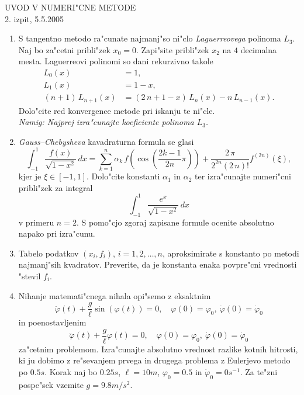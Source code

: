 

\begin{center}
  {\large UVOD V NUMERI"CNE METODE\\
    2. izpit, 5.5.2005\\
    }
\end{center}
\vspace{1cm}

\begin{enumerate}

  \item S tangentno metodo ra"cunate najmanj"so ni"clo
      {\sl Laguerreovega} polinoma $L_3$. Naj bo za"cetni pribli"zek
      $x_0=0$. Zapi"site pribli"zek $x_2$ na $4$ decimalna mesta.
      Laguerreovi polinomi so dani rekurzivno takole
      \begin{align*}
        L_0(x)&=1,\\
        L_1(x)&=1-x,\\
        (n+1)\,L_{n+1}(x)&=(2\,n+1-x)\,L_n(x)-n\,L_{n-1}(x).
      \end{align*}
      Dolo"cite red konvergence metode pri iskanju te ni"cle.\\
      {\sl Namig: Najprej izra"cunajte koeficiente polinoma $L_3$.}
  
  \item {\sl Gauss--Chebysheva} kavadraturna formula
      se glasi
      $$\int_{-1}^{1}\frac{f(x)}{\sqrt{1-x^2}}\,dx=
        \sum_{k=1}^n \alpha_k\,f\left(\cos\left(\frac{2k-1}{2n}\pi\right)\right)+
        \frac{2\,\pi}{2^{2n}(2\,n)!}f^{(2n)}(\xi),$$ 
      kjer je $\xi\in[-1,1]$. 
      Dolo"cite konstanti $\alpha_1$ in $\alpha_2$ ter 
      izra"cunajte numeri"cni pribli"zek
      za integral
      $$\int_{-1}^{1}\frac{e^{x}}{\sqrt{1-x^2}}\,dx$$
      v primeru $n=2$. S pomo"cjo zgoraj zapisane formule
      ocenite absolutno napako pri izra"cunu.

  \item Tabelo podatkov $(x_i,f_i)$, $i=1,2,\dots,n$, 
      aproksimirate s konstanto po metodi
      najmanj"sih kvadratov. Preverite, da je konstanta enaka povpre"cni vrednosti
      "stevil $f_i$.  

  \item Nihanje matemati"cnega nihala opi"semo z eksaktnim  
    $$\ddot\varphi(t)+\frac{g}{\ell}\sin(\varphi(t))=0, \quad \varphi(0)=\varphi_0,\ 
      \dot\varphi(0)=\dot\varphi_0$$
    in poenostavljenim 
     $$\ddot\varphi(t)+\frac{g}{\ell}\varphi(t)=0, \quad \varphi(0)=\varphi_0,\ 
      \dot\varphi(0)=\dot\varphi_0$$
    za"cetnim problemom. 
    Izra"cunajte absolutno vrednost razlike kotnih hitrosti, 
    ki ju dobimo z re"sevanjem prvega in drugega
    problema z Eulerjevo metodo po $0.5s$. Korak naj bo $0.25s$, $\ell=10m$,
    $\varphi_0=0.5$ in $\dot\varphi_0=0s^{-1}$. Za te"zni pospe"sek vzemite
    $g=9.8m/s^2$.

\end{enumerate}
